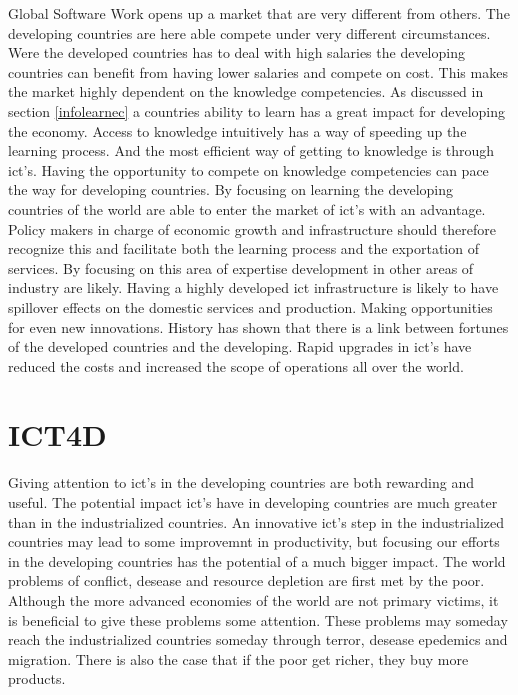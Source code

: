 Global Software Work opens up a market that are very different from others.
The developing countries are here able compete under very different circumstances.
Were the developed countries has to deal with high salaries the developing countries can benefit from having lower salaries and compete on cost. This makes the market highly dependent on the knowledge competencies. As discussed in section \ref{infolearnec} a countries ability to learn has a great impact for developing the economy. Access to knowledge intuitively has a way of speeding up the learning process. And the most efficient way of getting to knowledge is through \gls{ict}'s. 
Having the opportunity to compete on knowledge competencies can pace the way for developing countries. By focusing on learning the developing countries of the world are able to enter the market of \gls{ict}'s with an advantage. Policy makers in charge of economic growth and infrastructure should therefore recognize this and facilitate both the learning process and the exportation of services. 
By focusing on this area of expertise development in other areas of industry are likely.
Having a highly developed \gls{ict} infrastructure is likely to have spillover effects on the domestic services and production. Making opportunities for even new innovations. 
History has shown that there is a link between fortunes of the developed countries and the developing. Rapid upgrades in \gls{ict}'s have reduced the costs and increased the scope of operations all over the world. 


\cite{sbs:gio}
\cite{offit:paan}


\section{ICT4D}
Giving attention to \gls{ict}'s in the developing countries are both rewarding and useful. 
The potential impact \gls{ict}'s have in developing countries are much greater than in the industrialized countries. 
An innovative \gls{ict}'s step in the industrialized countries may lead to some improvemnt in productivity, but focusing our efforts in the developing countries has the potential of a much bigger impact.
The world problems of conflict, desease and resource depletion are first met by the poor. 
Although the more advanced economies of the world are not primary victims, it is beneficial to give these problems some attention.
These problems may someday reach the industrialized countries someday through terror, desease epedemics and migration. 
There is also the case that if the poor get richer, they buy more products. 


